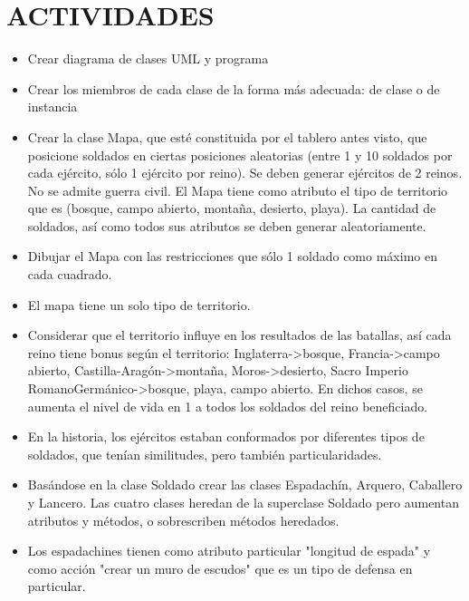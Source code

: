 \documentclass{article}
\begin{document}
    \section{ACTIVIDADES}
	\begin{itemize}
      
        \item Crear diagrama de clases UML y programa

        \item Crear los miembros de cada clase de la forma más adecuada: de clase o de instancia
        
        \item Crear la clase Mapa, que esté constituida por el tablero antes visto, que posicione soldados en ciertas posiciones aleatorias (entre 1 y 10 soldados por cada ejército, sólo 1 ejército por reino). Se deben generar ejércitos de 2 reinos. No se admite guerra civil. El Mapa tiene como atributo el tipo de territorio que es (bosque, campo abierto, montaña, desierto, playa). La cantidad de soldados, así como todos sus atributos se deben generar aleatoriamente.

        \item Dibujar el Mapa con las restricciones que sólo 1 soldado como máximo en cada cuadrado.
        
        \item El mapa tiene un solo tipo de territorio.
        
        \item Considerar que el territorio influye en los resultados de las batallas, así cada reino tiene bonus según el territorio: Inglaterra->bosque, Francia->campo abierto, Castilla-Aragón->montaña, Moros->desierto, Sacro Imperio RomanoGermánico->bosque, playa, campo abierto. En dichos casos, se aumenta el nivel de vida en 1 a todos los soldados del reino beneficiado.

        \item En la historia, los ejércitos estaban conformados por diferentes tipos de soldados, que tenían similitudes, pero también particularidades.
        
        \item Basándose en la clase Soldado crear las clases Espadachín, Arquero, Caballero y Lancero. Las cuatro clases heredan de la superclase Soldado pero aumentan atributos y métodos, o sobrescriben métodos heredados.

        \item Los espadachines tienen como atributo particular "longitud de espada" y como acción "crear un muro de escudos" que es un tipo de defensa en particular.


\end{itemize}
\end{document}
